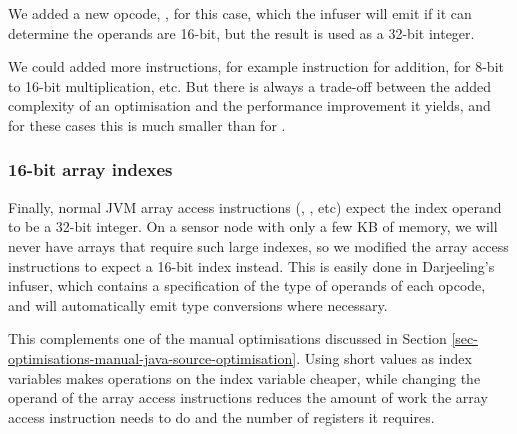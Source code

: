 We added a new opcode, , for this case, which the infuser will emit if it can determine the operands are 16-bit, but the result is used as a 32-bit integer.

We could added more instructions, for example  instruction for addition,  for 8-bit to 16-bit multiplication, etc. But there is always a trade-off between the added complexity of an optimisation and the performance improvement it yields, and for these cases this is much smaller than for .

\subsubsection{16-bit array indexes}
Finally, normal JVM array access instructions (, , etc) expect the index operand to be a 32-bit integer. On a sensor node with only a few KB of memory, we will never have arrays that require such large indexes, so we modified the array access instructions to expect a 16-bit index instead. This is easily done in Darjeeling's infuser, which contains a specification of the type of operands of each opcode, and will automatically emit type conversions where necessary.

This complements one of the manual optimisations discussed in Section \ref{sec-optimisations-manual-java-source-optimisation}. Using short values as index variables makes operations on the index variable cheaper, while changing the operand of the array access instructions reduces the amount of work the array access instruction needs to do and the number of registers it requires.

